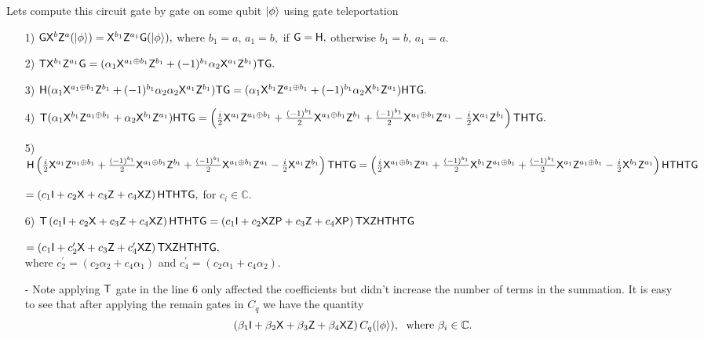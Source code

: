 Lets compute this circuit gate by gate on some qubit ${\lvert}\phi\rangle$ using gate teleportation
 \begin{enumerate}
\item[1)] $\textsf{G} {\sf X}^{b}{\sf Z}^{a}({\lvert}\phi\rangle)={\sf X}^{b_1}{\sf Z}^{a_1}\textsf{G}({\lvert}\phi\rangle),$
where $b_1=a,\, a_1=b,$ if $\textsf{G} ={\sf H},$  otherwise   $b_1=b,\, a_1=a.$\\
\item[2)] ${\sf T}{\sf X}^{b_1}{\sf Z}^{a_1}\textsf{G}= (\alpha_1{\sf X}^{a_1\oplus b_1 }{\sf Z}^{b_1} +(-1)^{b_1} \alpha_2{\sf X}^{a_1}{\sf Z}^{b_1}){\sf T} \textsf{G}.$
\item[3)]   ${\sf H} (\alpha_1{\sf X}^{a_1\oplus b_1 }{\sf Z}^{b_1} + (-1)^{b_1} \alpha_2\alpha_2{\sf X}^{a_1}{\sf Z}^{b_1}){\sf T} \textsf{G}=(\alpha_1{\sf X}^{b_1}{\sf Z}^{a_1\oplus b_1 } + (-1)^{b_1} \alpha_2{\sf X}^{b_1}{\sf Z}^{a_1}) {\sf H} {\sf T} \textsf{G}.$
\item[4)] ${\sf T}(\alpha_1{\sf X}^{b_1}{\sf Z}^{a_1\oplus b_1 } + \alpha_2{\sf X}^{b_1}{\sf Z}^{a_1}) {\sf H} {\sf T} \textsf{G}=\left(\frac{i}{2}{\sf X}^{a_1}{\sf Z}^{a_1\oplus b_1 } +  \frac{(-1)^{b_1}}{2}{\sf X}^{a_1\oplus b_1}{\sf Z}^{b_1}+
   \frac{(-1)^{b_1}}{2}{\sf X}^{a_1\oplus b_1}{\sf Z}^{a_1}  - \frac{i}{2}{\sf X}^{a_1}{\sf Z}^{b_1} \right) {\sf T}{\sf H} {\sf T} \textsf{G}.$

\item[5)]${\sf H}  \left(\frac{i}{2}{\sf X}^{a_1}{\sf Z}^{a_1\oplus b_1 } +  \frac{(-1)^{b_1}}{2}{\sf X}^{a_1\oplus b_1}{\sf Z}^{b_1}+
   \frac{(-1)^{b_1}}{2}{\sf X}^{a_1\oplus b_1}{\sf Z}^{a_1}  - \frac{i}{2}{\sf X}^{a_1}{\sf Z}^{b_1} \right){\sf T}{\sf H} {\sf T} \textsf{G}\\=  \left(\frac{i}{2}{\sf X}^{a_1\oplus b_1}{\sf Z}^{a_1} +  \frac{(-1)^{b_1}}{2}{\sf X}^{b_1}{\sf Z}^{a_1\oplus b_1}+
   \frac{(-1)^{b_1}}{2}{\sf X}^{a_1}{\sf Z}^{a_1\oplus b_1}  - \frac{i}{2}{\sf X}^{b_1}{\sf Z}^{a_1} \right){\sf H} {\sf T}{\sf H} {\sf T} \textsf{G}$

   $=\left(c_1{\sf I}+ c_2{\sf X}+c_3{\sf Z}+c_4{\sf X}{\sf Z}\right){\sf H}{\sf T}{\sf H} {\sf T} \textsf{G},$  for $c_i\in \mathbb{C}.$
\item[6)]  ${\sf T}\left(c_1{\sf I}+ c_2{\sf X}+c_3{\sf Z}+c_4{\sf X}{\sf Z}\right){\sf H}{\sf T}{\sf H} {\sf T} \textsf{G}=\left(c_1{\sf I}+ c_2{\sf X} {\sf Z}{\sf P}+c_3{\sf Z} +c_4{\sf X}{\sf P}\right){\sf T} {\sf X}{\sf Z}{\sf H}{\sf T}{\sf H} {\sf T} \textsf{G}$

 \hspace{2.3in}   $=\left(c_1{\sf I}+ c_2^\prime{\sf X}+c_3{\sf Z}+c_4^\prime{\sf X}{\sf Z}\right){\sf T} {\sf X}{\sf Z}{\sf H}{\sf T}{\sf H} {\sf T} \textsf{G},$ \\
  where $c_2^\prime=(c_2\alpha_2+c_4\alpha_1)$ and $c_4^\prime=(c_2\alpha_1+c_4\alpha_2).$
\item[-] Note applying ${\sf T}$ gate in the line 6 only affected the coefficients but didn't increase the number of terms in the summation. It is easy to see that after applying the remain gates in $C_q$ we  have the quantity
$$\left(\beta_1 {\sf I}+\beta_2 {\sf X}+\beta_3 {\sf Z}+\beta_4 {\sf X} {\sf Z}\right) C_q({\lvert}\phi\rangle), \; \mbox{ where } \beta_i\in \mathbb{C}.$$
\end{enumerate}
